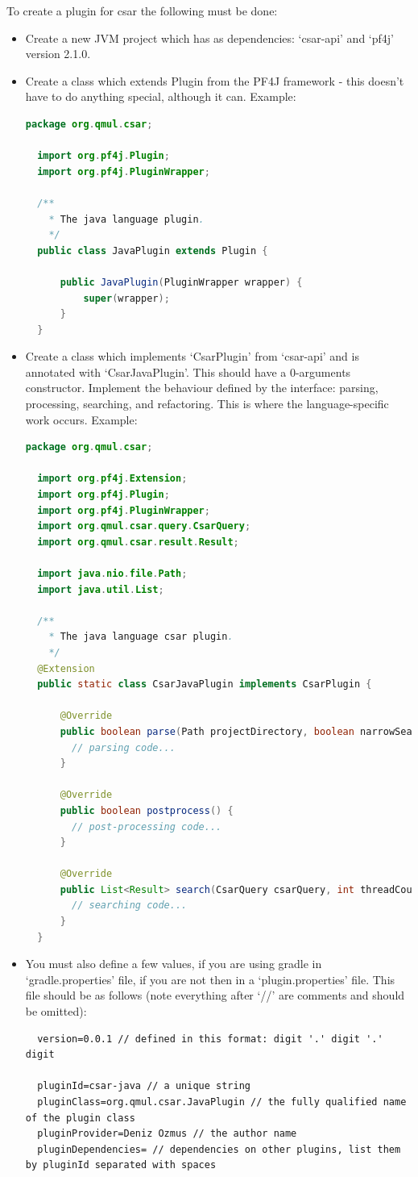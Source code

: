 \documentclass[12pt, letterpaper]{article}
\begin{document}
To create a plugin for csar the following must be done:
\begin{itemize}
  \item Create a new JVM project which has as dependencies: `csar-api' and `pf4j' version 2.1.0.
  \item Create a class which extends Plugin from the PF4J framework - this doesn't have to do anything special, although it can.
  Example:
  \begin{lstlisting}[language=Java]
  package org.qmul.csar;

  import org.pf4j.Plugin;
  import org.pf4j.PluginWrapper;

  /**
    * The java language plugin.
    */
  public class JavaPlugin extends Plugin {

      public JavaPlugin(PluginWrapper wrapper) {
          super(wrapper);
      }
  }
  \end{lstlisting}
  \item Create a class which implements `CsarPlugin' from `csar-api' and is annotated with `CsarJavaPlugin'.
  This should have a 0-arguments constructor.
  Implement the behaviour defined by the interface: parsing, processing, searching, and refactoring.
  This is where the language-specific work occurs.
  Example:
  \begin{lstlisting}[language=Java]
  package org.qmul.csar;

  import org.pf4j.Extension;
  import org.pf4j.Plugin;
  import org.pf4j.PluginWrapper;
  import org.qmul.csar.query.CsarQuery;
  import org.qmul.csar.result.Result;

  import java.nio.file.Path;
  import java.util.List;
      
  /**
    * The java language csar plugin.
    */
  @Extension
  public static class CsarJavaPlugin implements CsarPlugin {

      @Override
      public boolean parse(Path projectDirectory, boolean narrowSearch, Path ignoreFile, int threadCount) {
        // parsing code...
      }

      @Override
      public boolean postprocess() {
        // post-processing code...
      }

      @Override
      public List<Result> search(CsarQuery csarQuery, int threadCount) throws Exception {
        // searching code...
      }
  }
  \end{lstlisting}
  \item You must also define a few values, if you are using gradle in `gradle.properties' file, if you are not then in a `plugin.properties' file.
  This file should be as follows (note everything after `//' are comments and should be omitted):
  \begin{lstlisting}
  version=0.0.1 // defined in this format: digit '.' digit '.' digit

  pluginId=csar-java // a unique string
  pluginClass=org.qmul.csar.JavaPlugin // the fully qualified name of the plugin class
  pluginProvider=Deniz Ozmus // the author name
  pluginDependencies= // dependencies on other plugins, list them by pluginId separated with spaces
  \end{lstlisting}
\end{itemize}
\end{document}
